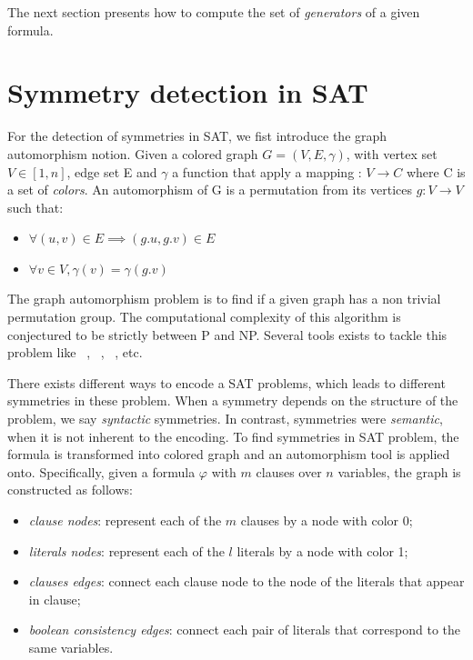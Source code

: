 The next section presents how to compute the set of \emph{generators} of a given formula.

\section{Symmetry detection in SAT}

For the detection of symmetries in SAT, we fist introduce the graph automorphism notion.
Given a colored graph $G = (V, E, \gamma)$, with vertex set $V \in  [1, n] $, edge set E and
$\gamma$ a function that apply a mapping : $V \rightarrow C$ where C is a set of \emph{colors}.
An automorphism of G is a permutation from its vertices $g :V \rightarrow V$ 
such that:
\begin{itemize}
	\item $\forall (u, v) \in E \implies (g.u, g.v) \in E$
	\item $\forall v \in V, \gamma(v) = \gamma(g.v)$
\end{itemize}

The graph automorphism problem is to find if a given graph has a non trivial permutation group. 
The computational complexity of this algorithm is conjectured to be strictly between P and NP.
Several tools exists to tackle this problem like \saucy~\cite{katebi2010symmetry},
\bliss~\cite{JunttilaKaski:ALENEX2007}, \nauty~\cite{mckay2003nauty}, etc.



There exists different ways to encode a SAT problems,
which leads to different symmetries in these problem.
When a symmetry depends on the structure of the problem, we say \emph{syntactic} symmetries. 
In contrast, symmetries were \emph{semantic}, when it is not inherent to the encoding.
To find symmetries in SAT problem, the formula is transformed into colored graph
and an automorphism tool is applied onto. Specifically, given a formula $\varphi$ with
$m$ clauses over $n$ variables, the graph is constructed as follows:
\begin{itemize}
	\item \emph{clause nodes}: represent each of the $m$ clauses by a node with color 0;
	\item \emph{literals nodes}: represent each of the $l$ literals by a node with color 1;
	\item \emph{clauses edges}: connect each clause node to the node of the literals that appear in clause;
	\item \emph{boolean consistency edges}: connect each pair of literals that correspond to the same variables.
\end{itemize}


